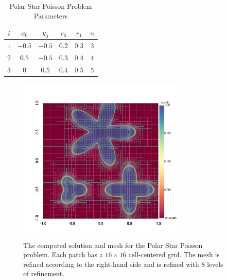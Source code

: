 \begin{table}[ht]
    \begin{center}
        \caption{Polar Star Poisson Problem Parameters}
        \begin{tabular}{|c|c|c|c|c|c|}
            \hline
            $i$ & $x_0$ & $y_0$ & $r_0$ & $r_1$ & $n$ \\
            \hline
            $1$ & $-0.5$ & $-0.5$ & $0.2$ & $0.3$ & $3$ \\
            $2$ & $0.5$ & $-0.5$ & $0.3$ & $0.4$ & $4$ \\
            $3$ & $0$ & $0.5$ & $0.4$ & $0.5$ & $5$ \\
            \hline
        \end{tabular}
        \label{table:polar_star_parameters}
    \end{center}
\end{table}

\begin{figure}
    \centering
    \includegraphics[width=0.75\textwidth, trim={0 100 0 0}]{figures/plot_polar_star.png}
    \caption{The computed solution and mesh for the Polar Star Poisson problem. Each patch has a $16 \times 16$ cell-centered grid. The mesh is refined according to the right-hand side and is refined with 8 levels of refinement.}
    \label{fig:polar_star_plot}
\end{figure}

